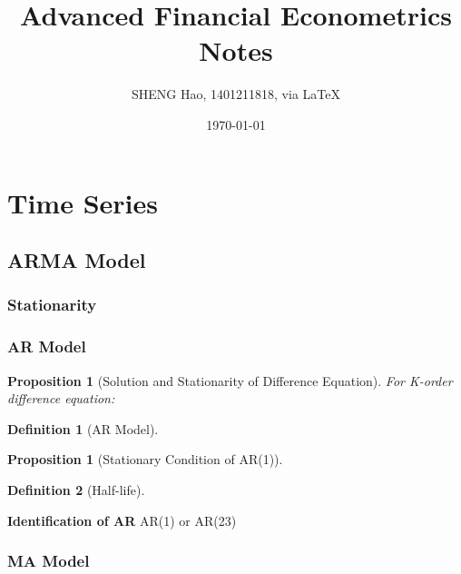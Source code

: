 \documentclass{article}
\theoremstyle{plain}
\newtheorem{prop}[thm]{Proposition}
\theoremstyle{definition}
\newtheorem{defn}{Definition}[section]
\theoremstyle{remark}
\begin{document}
\title{Advanced Financial Econometrics\\Notes}
\author{{\normalsize SHENG Hao, 1401211818, via \LaTeX}}
\date{\today}

\maketitle

\def \Pr{{\rm Pr}}
\baselineskip 0.6cm
\section{Time Series}
\subsection{ARMA Model}
\subsubsection{Stationarity}
\subsubsection{AR Model}
\begin{prop}[Solution and Stationarity of Difference Equation]
For K-order difference equation:
\end{prop}
\begin{defn}[AR Model]
\end{defn}
\begin{prop}[Stationary Condition of AR(1)]
\end{prop}
\begin{defn}[Half-life]
\end{defn}
{\bf \centering Identification of AR}
AR(1) or AR(23)
\subsubsection{MA Model}
\end{document}
